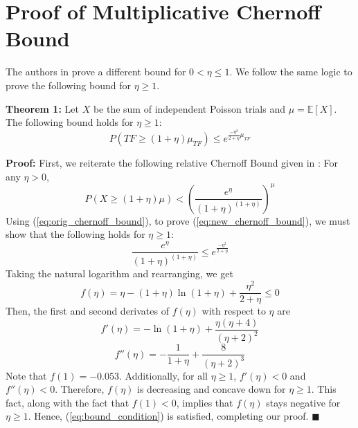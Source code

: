 \section{Proof of Multiplicative Chernoff Bound}
\label{sec:chernoff_bound_proof}

The authors in \cite{mitzenmacher2005probability} prove a different bound for $0 < \eta \leq 1$.  We follow the same logic to prove the following bound for $\eta \geq 1$.

\noindent
{\bf Theorem 1:}
Let $X$ be the sum of independent Poisson trials and $\mu = \mathbb{E}[X]$.  The following bound holds for $\eta \geq 1$:
\begin{equation}
\label{eq:new_chernoff_bound}
	P( TF \geq (1 + \eta)\mu_{TF} ) \leq e^{\frac{-\eta^2}{2+\eta}\mu_{TF}}
\end{equation}

\noindent
{\bf Proof:}
First, we reiterate the following relative Chernoff Bound given in \cite{mitzenmacher2005probability}:  
For any $\eta > 0$, 
\begin{equation}
\label{eq:orig_chernoff_bound}
	P( X \geq (1 + \eta) \mu ) < ( \frac{e^\eta}{(1+\eta)^{(1+\eta)}} )^\mu
\end{equation}
Using (\ref{eq:orig_chernoff_bound}), to prove (\ref{eq:new_chernoff_bound}), we must show that the following holds for $\eta \geq 1$:
\begin{equation}
\label{eq:bound_condition}
	\frac{e^\eta}{(1+\eta)^{(1+\eta)}} \leq e^{\frac{-\eta^2}{2+\eta}}
\end{equation}
Taking the natural logarithm and rearranging, we get
\begin{equation}
	f( \eta ) = \eta - (1+\eta)\ln(1+\eta) + \frac{\eta^2}{2+\eta} \leq 0
\end{equation}
Then, the first and second derivates of $f(\eta)$ with respect to $\eta$ are
\begin{equation}
	f'( \eta ) = -\ln(1+\eta) + \frac{\eta(\eta + 4)}{(\eta+2)^2}
\end{equation}
\begin{equation}
	f''( \eta ) = -\frac{1}{1+\eta} + \frac{8}{(\eta+2)^3}
\end{equation}
Note that $f(1) = -0.053$.  Additionally, for all $\eta \geq 1$, $f'(\eta) < 0$ and $f''(\eta) < 0$.  Therefore, $f(\eta)$ is decreasing and concave down for $\eta \geq 1$.  This fact, along with the fact that $f(1) < 0$, implies that $f(\eta)$ stays negative for $\eta \geq 1$.  Hence, (\ref{eq:bound_condition}) is satisfied, completing our proof.
\hfill$\blacksquare$

